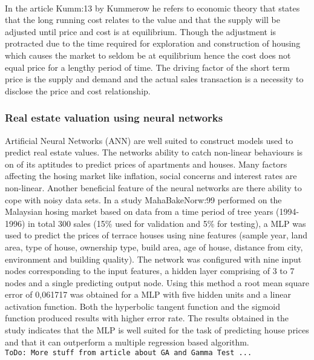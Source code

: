 \\
In the article \cite{art}{Kumm:13} by Kummerow he refers to economic theory that states that the long running cost relates to the value and that the supply will be adjusted until price and cost is at equilibrium. Though the adjustment is protracted due to the time required for exploration and construction of housing which causes the market to seldom be at equilibrium hence the cost does not equal price for a lengthy period of time. The driving factor of the short term price is the supply and demand and the actual sales transaction is a necessity to disclose the price and cost relationship.  


\subsubsection{Real estate valuation using neural networks} \label{sss:using_ann}
Artificial Neural Networks (ANN) are well suited to construct models used to predict real estate values. The networks ability to catch non-linear behaviours is on of its aptitudes to predict prices of apartments and houses. Many factors affecting the hosing market like inflation, social concerns and interest rates are non-linear. Another beneficial feature of the neural networks are there ability to cope with noisy data sets. In a study \cite{art}{MahaBakeNorw:99} performed on the Malaysian hosing market based on data from a time period of tree years (1994-1996) in total 300 sales (15\% used for validation and 5\% for testing), a MLP was used to predict the prices of terrace houses using nine features (sample year, land area, type of house, ownership type, build area, age of house, distance from city, environment and building quality). The network was configured with nine input nodes corresponding to the input features, a hidden layer comprising of 3 to 7 nodes and a single predicting output node. Using this method a root mean square error of 0,061717 was obtained for a MLP with five hidden units and a linear activation function. Both the hyperbolic tangent function and the sigmoid function produced results with higher error rate. The results obtained in the study indicates that the MLP is well suited for the task of predicting house prices and that it can outperform a multiple regression based algorithm.     
\\
\texttt{ToDo: More stuff from article about GA and Gamma Test ...}
\\
